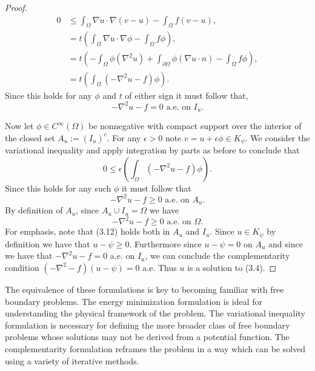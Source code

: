 \documentclass[12 pt]{report}
\begin{document}
\begin{proof}
  \begin{align*}
    0 &\leq \int_\Omega \nabla u \cdot \nabla(v - u) - \int_\Omega f(v - u),\\
    &= t\left(\int_\Omega \nabla u \cdot \nabla\phi - \int_\Omega f\phi\right),\\
    &= t\left(-\int_\Omega \phi(\nabla^2u) + \int_{\partial \Omega} \phi(\nabla u \cdot n) - \int_\Omega f\phi \right),\\
    &= t\left(\int_\Omega (-\nabla^2u - f)\phi\right).
  \end{align*}
  Since this holds for any $\phi$ and $t$ of either sign it must follow that,
  \begin{equation}
    -\nabla^2u - f = 0 \text{ a.e. on } I_u.
  \end{equation}

  Now let $\phi \in C^\infty(\Omega)$ be nonnegative with compact support over the interior of the closed set $A_u := (I_u)^c$. For any $\epsilon > 0$ note $v = u + \epsilon\phi \in K_\psi$. We consider the variational inequality and apply integration by parts as before to conclude that
  \begin{equation}
   0 \leq \epsilon \left(\int_\Omega (-\nabla^2u - f)\phi\right).
  \end{equation}
  Since this holds for any such $\phi$ it must follow that
  \begin{equation}
    -\nabla^2u - f \geq 0 \text{ a.e. on } A_u.
  \end{equation}
  By definition of $A_u$, since $A_u \cup I_u = \Omega$ we have
  \begin{equation}
    -\nabla^2u - f \geq 0 \text{ a.e. on } \Omega.
  \end{equation}
  For emphasis, note that (3.12) holds both in $A_u$ and $I_u$. Since $u \in K_\psi$ by definition we have that $u - \psi \geq 0$. Furthermore since $u - \psi = 0$ on $A_u$ and since we have that $-\nabla^2u - f = 0$ a.e. on $I_u$, we can conclude the complementarity condition $(-\nabla^2 - f)(u - \psi) = 0$ a.e. Thus $u$ is a solution to (3.4). 
\end{proof}
The equivalence of these formulations is key to becoming familiar with free boundary problems. The energy minimization formulation is ideal for understanding the physical framework of the problem. The variational inequality formulation is necessary for defining the more broader class of free boundary problems whose solutions may not be derived from a potential function. The complementarity formulation reframes the problem in a way which can be solved using a variety of iterative methods.
\end{document}
